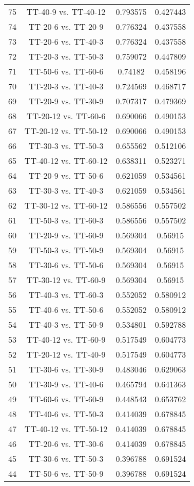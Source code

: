 \documentclass[a4paper,10pt]{article}
\begin{document}
\begin{landscape}
\begin{table}[!htp]
\begin{tabular}{cccc}
75&TT-40-9 vs. TT-40-12&0.793575&0.427443\\
74&TT-20-6 vs. TT-20-9&0.776324&0.437558\\
73&TT-20-6 vs. TT-40-3&0.776324&0.437558\\
72&TT-20-3 vs. TT-50-3&0.759072&0.447809\\
71&TT-50-6 vs. TT-60-6&0.74182&0.458196\\
70&TT-20-3 vs. TT-40-3&0.724569&0.468717\\
69&TT-20-9 vs. TT-30-9&0.707317&0.479369\\
68&TT-20-12 vs. TT-60-6&0.690066&0.490153\\
67&TT-20-12 vs. TT-50-12&0.690066&0.490153\\
66&TT-30-3 vs. TT-50-3&0.655562&0.512106\\
65&TT-40-12 vs. TT-60-12&0.638311&0.523271\\
64&TT-20-9 vs. TT-50-6&0.621059&0.534561\\
63&TT-30-3 vs. TT-40-3&0.621059&0.534561\\
62&TT-30-12 vs. TT-60-12&0.586556&0.557502\\
61&TT-50-3 vs. TT-60-3&0.586556&0.557502\\
60&TT-20-9 vs. TT-60-9&0.569304&0.56915\\
59&TT-50-3 vs. TT-50-9&0.569304&0.56915\\
58&TT-30-6 vs. TT-50-6&0.569304&0.56915\\
57&TT-30-12 vs. TT-60-9&0.569304&0.56915\\
56&TT-40-3 vs. TT-60-3&0.552052&0.580912\\
55&TT-40-6 vs. TT-50-6&0.552052&0.580912\\
54&TT-40-3 vs. TT-50-9&0.534801&0.592788\\
53&TT-40-12 vs. TT-60-9&0.517549&0.604773\\
52&TT-20-12 vs. TT-40-9&0.517549&0.604773\\
51&TT-30-6 vs. TT-30-9&0.483046&0.629063\\
50&TT-30-9 vs. TT-40-6&0.465794&0.641363\\
49&TT-60-6 vs. TT-60-9&0.448543&0.653762\\
48&TT-40-6 vs. TT-50-3&0.414039&0.678845\\
47&TT-40-12 vs. TT-50-12&0.414039&0.678845\\
46&TT-20-6 vs. TT-30-6&0.414039&0.678845\\
45&TT-30-6 vs. TT-50-3&0.396788&0.691524\\
44&TT-50-6 vs. TT-50-9&0.396788&0.691524\\

\end{tabular}
\end{table}
\end{landscape}
\end{document}
